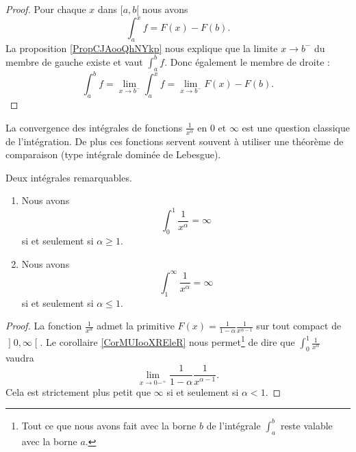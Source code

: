 \begin{proof}
    Pour chaque \( x\) dans \( \mathopen[ a , b [\) nous avons
    \begin{equation}
        \int_a^xf=F(x)-F(b).
    \end{equation}
    La proposition \ref{PropCJAooQhNYkp} nous explique que la limite \( x\to b^-\) du membre de gauche existe et vaut \( \int_a^bf\). Donc également le membre de droite :
    \begin{equation}
        \int_a^bf=\lim_{x\to b^-} \int_a^xf=\lim_{x\to b^-} F(x)-F(b).
    \end{equation}
\end{proof}

La convergence des intégrales de fonctions \( \frac{1}{ x^{\alpha} }\) en \( 0\) et \( \infty\) est une question classique de l'intégration. De plus ces fonctions servent souvent à utiliser une théorème de comparaison (type intégrale dominée de Lebesgue).
\begin{proposition} \label{PropBKNooPDIPUc}
    Deux intégrales remarquables.
    \begin{enumerate}
        \item
            
            Nous avons 
    \begin{equation}
        \int_0^1\frac{1}{ x^\alpha }=\infty
    \end{equation}
    si et seulement si \( \alpha\geq 1\).

\item

    Nous avons
    \begin{equation}
        \int_1^{\infty}\frac{1}{ x^{\alpha} }=\infty
    \end{equation}
    si et seulement si \( \alpha\leq1\).

    \end{enumerate}
    
\end{proposition}

\begin{proof}
La fonction \( \frac{1}{ x^{\alpha} }\) admet la primitive \( F(x)=\frac{1}{ 1-\alpha }\frac{1}{ x^{\alpha-1} }\) sur tout compact de \( \mathopen] 0 , \infty \mathclose[\). Le corollaire \ref{CorMUIooXREleR} nous permet\footnote{Tout ce que nous avons fait avec la borne \( b\) de l'intégrale \( \int_a^b\) reste valable avec la borne \( a\).} de dire que \( \int_0^1\frac{1}{ x^{\alpha} }\) vaudra
    \begin{equation}
        \lim_{x\to 0-^+} \frac{1}{ 1-\alpha }\frac{1}{ x^{\alpha-1} }.
    \end{equation}
    Cela est strictement plus petit que \( \infty\) si et seulement si \( \alpha<1\).
\end{proof}

